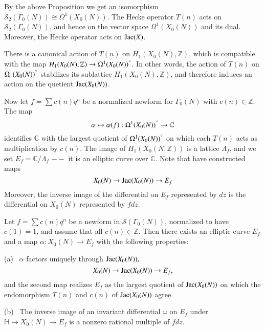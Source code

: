 \documentclass[11pt]{article}
\begin{document}
By the above Proposition we get an isomorphism $\mathcal{S_2} (\Gamma _0(N)) \cong \Omega^1 (X_0(N))$. 
The Hecke operator $T(n)$ acts on $\mathcal{S}_2(\Gamma_0(N))$, and hence on the vector space $\Omega^1(X_0(N))$ and its dual.
Moreover, the Hecke operator acts on ${\rm Jac}(X)$.
\begin{proposition}
    There is a canonical action of $T(n)$ on $H_1(X_0(N),\mathbb{Z})$, which is compatible with the map 
    $H_1(X_0(N),\mathbb{Z})\rightarrow \Omega^1(X_0(N))^{\spcheck}$. In other words, the action of $T(n)$ on $\Omega^1(X_0(N))^{\spcheck}$
    stabilizes its sublattice $H_1(X_0(N),\mathbb{Z})$, and therefore induces an action on the quetient ${\rm Jac}(X_0(N))$.
\end{proposition}
Now let $f=\sum c(n) q^n$ be a normalized newform for $\Gamma_0(N)$ with $c(n)\in \mathbb{Z}$. The map 
\begin{equation*}
    \alpha \mapsto \alpha(f):\Omega^1(X_0(N))^{\spcheck}\rightarrow \mathbb{C}
\end{equation*}
identifies $\mathbb{C}$ with the largest quotient of $\Omega^1(X_0(N))^{\spcheck}$ on which each $T(n)$ acts as multiplication
by $c(n)$. The image of $H_1(X_0(N,\mathbb{Z}))$ is a lattice $\Lambda_f$, and we set $E_f=\mathbb{C}/\Lambda_f$ $--$ it is an elliptic
curve over $\mathbb{C}$. Note that have constructed maps
\begin{equation*}
    X_0(N)\rightarrow {\rm Jac}(X_0(N))\rightarrow E_f
\end{equation*}
Moreover, the inverse image of the differential on $E_f$ represented by $dz$ is the differential on $X_0(N)$ represented by $fdz$.

\begin{theorem}
    Let $f=\sum c(n)q^n$ be a newform in $\mathcal{S} (\Gamma_0(N))$, normalized to have $c(1)=1$, and assume that all $c(n)\in \mathbb{Z}$.
    Then there exists an elliptic curve $E_f$ and a map $\alpha:X_0(N)\rightarrow E_f$ with the following properties:\par
    (a) \ $\alpha$ factors uniquely through ${\rm Jac}(X_0(N)),$
    \begin{equation*}
        X_0(N)\rightarrow {\rm Jac}(X_0(N)) \rightarrow E_f,
    \end{equation*}  
    and the second map realizes $E_f$ as the largest quotient of ${\rm Jac}(X_0(N))$ on which the endomorphism $T(n)$ and $c(n)$ of 
    ${\rm Jac}(X_0(N))$ agree.\par
    (b) \ The inverse image of an invariant differential $\omega$ on $E_f$ under $\mathbb{H}\rightarrow X_0(N) \rightarrow E_f$ is 
    a nonzero rational multiple of $fdz$.
    \label{Thm:Modularity}

\end{theorem}
\end{document}

